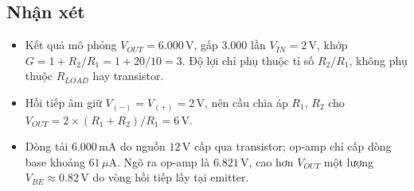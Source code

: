 \subsection{Nhận xét}
\begin{remarkbox}
\begin{itemize}[nosep]
  \item Kết quả mô phỏng $V_{OUT} = 6.000\,\text{V}$, gấp $3.000$ lần $V_{IN} = 2\,\text{V}$, khớp $G = 1 + R_2/R_1 = 1 + 20/10 = 3$. Độ lợi chỉ phụ thuộc tỉ số $R_2/R_1$, không phụ thuộc $R_{LOAD}$ hay transistor.
  \item Hồi tiếp âm giữ $V_{(-)} = V_{(+)} = 2\,\text{V}$, nên cầu chia áp $R_1$, $R_2$ cho $V_{OUT} = 2 \times (R_1 + R_2)/R_1 = 6\,\text{V}$.
  \item Dòng tải $6.000\,\text{mA}$ do nguồn $12\,\text{V}$ cấp qua transistor; op-amp chỉ cấp dòng base khoảng $61\,\mu\text{A}$. Ngõ ra op-amp là $6.821\,\text{V}$, cao hơn $V_{OUT}$ một lượng $V_{BE} \approx 0.82\,\text{V}$ do vòng hồi tiếp lấy tại emitter.
\end{itemize}
\end{remarkbox}

